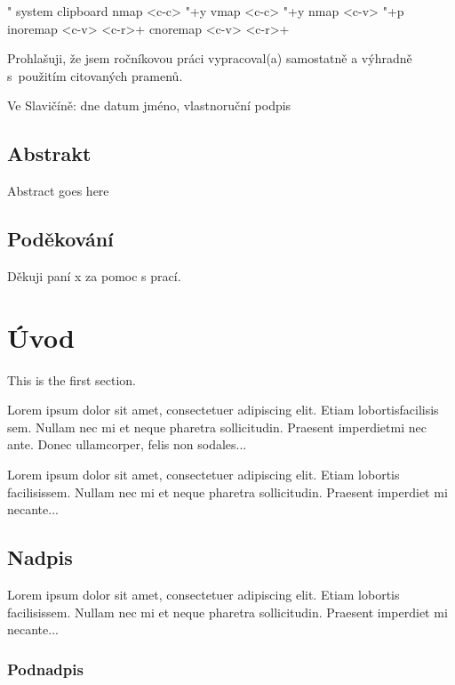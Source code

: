\documentclass[a4paper,12pt,oneside]{book}
\begin{document}
" system clipboard
nmap <c-c> "+y
vmap <c-c> "+y
nmap <c-v> "+p
inoremap <c-v> <c-r>+
cnoremap <c-v> <c-r>+

\newpage
\thispagestyle{empty}
\mbox{}
\newpage


\noindent
Prohlašuji, že jsem ročníkovou práci vypracoval(a) samostatně a výhradně s použitím citovaných pramenů.

Ve Slavičíně: dne datum jméno, vlastnoruční podpis


\newpage
\section*{Abstrakt}
Abstract goes here

\newpage
\section*{Poděkování}
Děkuji paní x za pomoc s prací.

\tableofcontents

\thispagestyle{fancy}

\chapter{Úvod}
\thispagestyle{fancy}

This is the first section.

Lorem  ipsum  dolor  sit  amet,  consectetuer  adipiscing
elit.   Etiam  lobortisfacilisis sem.  Nullam nec mi et
neque pharetra sollicitudin.  Praesent imperdietmi nec ante.
Donec ullamcorper, felis non sodales...


Lorem ipsum dolor sit amet, consectetuer adipiscing elit.
Etiam lobortis facilisissem.  Nullam nec mi et neque pharetra
sollicitudin.  Praesent imperdiet mi necante...

\section{Nadpis}

Lorem ipsum dolor sit amet, consectetuer adipiscing elit.
Etiam lobortis facilisissem.  Nullam nec mi et neque pharetra
sollicitudin.  Praesent imperdiet mi necante...

\subsection{Podnadpis}
\end{document}
